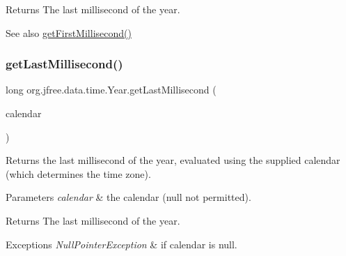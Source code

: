 \begin{DoxyReturn}{Returns}
The last millisecond of the year.
\end{DoxyReturn}
\begin{DoxySeeAlso}{See also}
\mbox{\hyperlink{classorg_1_1jfree_1_1data_1_1time_1_1_year_ad4c7220e5cd2c321ff4108c7a73ff68b}{get\+First\+Millisecond()}} 
\end{DoxySeeAlso}
\mbox{\label{classorg_1_1jfree_1_1data_1_1time_1_1_year_a0e83766f160b644bd495c7d70570ce08}} 
\subsubsection{\texorpdfstring{get\+Last\+Millisecond()}{getLastMillisecond()}\hspace{0.1cm}{\footnotesize\ttfamily [2/2]}}
{\footnotesize\ttfamily long org.\+jfree.\+data.\+time.\+Year.\+get\+Last\+Millisecond (\begin{DoxyParamCaption}\item[{Calendar}]{calendar }\end{DoxyParamCaption})}

Returns the last millisecond of the year, evaluated using the supplied calendar (which determines the time zone).


\begin{DoxyParams}{Parameters}
{\em calendar} & the calendar ({\ttfamily null} not permitted).\\
\hline
\end{DoxyParams}
\begin{DoxyReturn}{Returns}
The last millisecond of the year.
\end{DoxyReturn}

\begin{DoxyExceptions}{Exceptions}
{\em Null\+Pointer\+Exception} & if {\ttfamily calendar} is {\ttfamily null}. \\
\hline
\end{DoxyExceptions}
\mbox{\label{classorg_1_1jfree_1_1data_1_1time_1_1_year_affe76a52fc33bf8bc60f04fa8726bc73}} 
